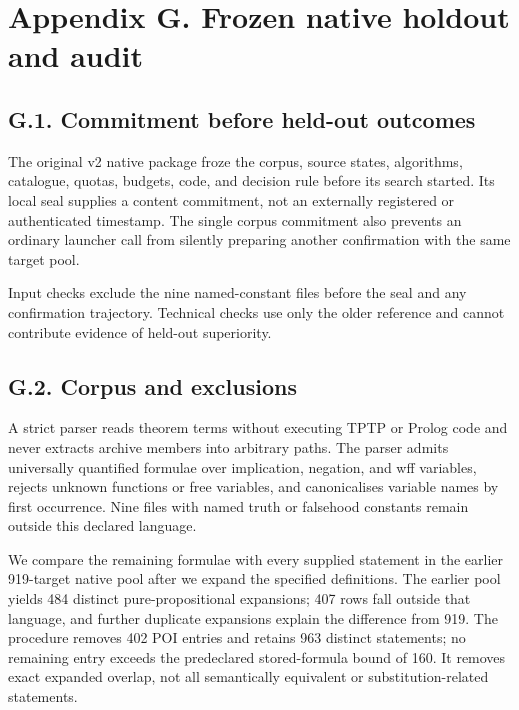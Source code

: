 \documentclass[pdflatex,sn-basic,Numbered]{sn-jnl}
\begin{document}
\section*{Appendix G. Frozen native holdout and audit}\label{appendix-g.-frozen-native-holdout-and-audit}

\subsection*{G.1. Commitment before held-out outcomes}\label{g.1.-commitment-before-held-out-outcomes}

The original v2 native package froze the corpus, source states, algorithms, catalogue, quotas, budgets, code, and decision rule before its search started. Its local seal supplies a content commitment, not an externally registered or authenticated timestamp. The single corpus commitment also prevents an ordinary launcher call from silently preparing another confirmation with the same target pool.

Input checks exclude the nine named-constant files before the seal and any confirmation trajectory. Technical checks use only the older reference and cannot contribute evidence of held-out superiority.

\subsection*{G.2. Corpus and exclusions}\label{g.2.-corpus-and-exclusions}

A strict parser reads theorem terms without executing TPTP or Prolog code and never extracts archive members into arbitrary paths. The parser admits universally quantified formulae over implication, negation, and wff variables, rejects unknown functions or free variables, and canonicalises variable names by first occurrence. Nine files with named truth or falsehood constants remain outside this declared language.

We compare the remaining formulae with every supplied statement in the earlier 919-target native pool after we expand the specified definitions. The earlier pool yields 484 distinct pure-propositional expansions; 407 rows fall outside that language, and further duplicate expansions explain the difference from 919. The procedure removes 402 POI entries and retains 963 distinct statements; no remaining entry exceeds the predeclared stored-formula bound of 160. It removes exact expanded overlap, not all semantically equivalent or substitution-related statements.
\end{document}
